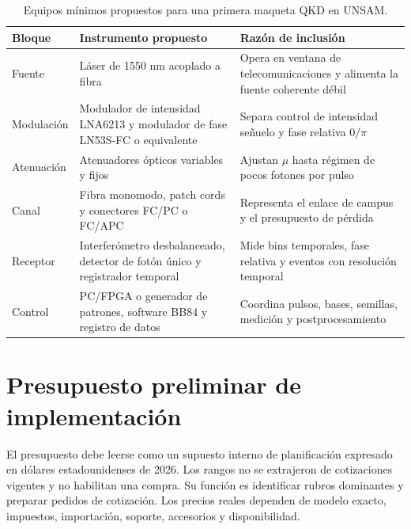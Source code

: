 \begin{table}[H]
  \centering
  \begin{tabularx}{\textwidth}{p{}XX}
    \toprule
    Bloque & Instrumento propuesto & Razón de inclusión \\
    \midrule
    Fuente & Láser de 1550 nm acoplado a fibra & Opera en ventana de telecomunicaciones y alimenta la fuente coherente débil \\
    Modulación & Modulador de intensidad LNA6213 y modulador de fase LN53S-FC o equivalente & Separa control de intensidad señuelo y fase relativa \(0/\pi\) \\
    Atenuación & Atenuadores ópticos variables y fijos & Ajustan \(\mu\) hasta régimen de pocos fotones por pulso \\
    Canal & Fibra monomodo, patch cords y conectores FC/PC o FC/APC & Representa el enlace de campus y el presupuesto de pérdida \\
    Receptor & Interferómetro desbalanceado, detector de fotón único y registrador temporal & Mide bins temporales, fase relativa y eventos con resolución temporal \\
    Control & PC/FPGA o generador de patrones, software BB84 y registro de datos & Coordina pulsos, bases, semillas, medición y postprocesamiento \\
    \bottomrule
  \end{tabularx}
  \caption{Equipos mínimos propuestos para una primera maqueta QKD en UNSAM.}
  \label{tab:equipos_unsam}
\end{table}

\section{Presupuesto preliminar de implementación}

El presupuesto debe leerse como un supuesto interno de planificación expresado en dólares estadounidenses de 2026. Los rangos no se extrajeron de cotizaciones vigentes y no habilitan una compra. Su función es identificar rubros dominantes y preparar pedidos de cotización. Los precios reales dependen de modelo exacto, impuestos, importación, soporte, accesorios y disponibilidad.

